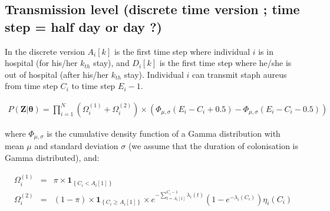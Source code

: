 \documentclass[10pt]{article}
\begin{document}

\subsection*{Transmission level (discrete time version ; time step = half day or day ?)} 


In the discrete version $A_i[k]$ is the first time step where individual $i$ is in hospital (for his/her $k_{th}$ stay), and $D_i[k]$ is the first time step where he/she is out of hospital (after his/her $k_{th}$ stay). Individual $i$ can transmit staph aureus from time step $C_i$ to time step $E_i-1$. 

\begin{eqnarray*}
P\left(\bm{Z}|\bm{\theta}\right) = 
\bm{\prod}_{i=1}^N %
\left( \Omega_i^{\left(1\right)} + \Omega_i^{\left(2\right)} \right) \times \left(\Phi_{\mu,\sigma}\left(E_i-C_i+0.5\right) - \Phi_{\mu,\sigma}\left(E_i-C_i-0.5\right) \right)
\end{eqnarray*}

\noindent where $\Phi_{\mu,\sigma}$ is the cumulative density function of a Gamma distribution with mean $\mu$ and standard deviation $\sigma$ (we assume that the duration of colonisation is Gamma distributed), and: 

\begin{eqnarray*}
\Omega_i^{\left(1\right)} & = & \pi \times \mathbf{1}_{\left\lbrace C_i < A_i[1] \right\rbrace}  \\
\Omega_i^{\left(2\right)}  & = & \left( 1-\pi \right) \times \mathbf{1}_{\left\lbrace C_i \geq A_i[1] \right\rbrace} \times e^{-\sum_{t=A_i[1]}^{C_i-1}\lambda_i\left(t\right)} \left( 1 - e^{-\lambda_i\left(C_i\right)} \right) \eta_i\left(C_i\right)\\
\end{eqnarray*}
\bigskip
\end{document}
